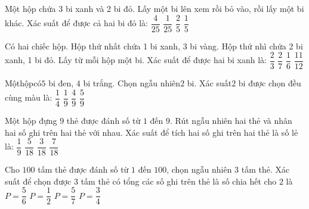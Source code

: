 \begin{ex}
Một hộp chứa 3 bi xanh và 2 bi đỏ. Lấy một bi lên xem rồi bỏ vào, rồi lấy một bi khác. Xác suất để được cả hai bi đỏ là:
\choice
{$\dfrac{4}{25}$}
{$\dfrac{1}{25}$}
{\True $\dfrac{2}{5}$}
{$\dfrac{1}{5}$}
\end{ex}
\begin{ex}
Có hai chiếc hộp. Hộp thứ nhất chứa 1 bi xanh, 3 bi vàng. Hộp thứ nhì chứa 2 bi xanh, 1 bi đỏ. Lấy từ mỗi hộp một bi. Xác suất để được hai bi xanh là:
\choice
{$\dfrac{2}{3}$}
{$\dfrac{2}{7}$}
{\True $\dfrac{1}{6}$}
{$\dfrac{11}{12}$}
\end{ex}
\begin{ex}
Mộthộpcó$5$ bi đen, $4$ bi trắng. Chọn ngẫu nhiên$2$ bi. Xác suất$2$ bi được chọn đều cùng màu là:
\choice
{$\dfrac{1}{4}$}
{$\dfrac{1}{9}$}
{\True $\dfrac{4}{9}$}
{$\dfrac{5}{9}$}
\end{ex}
\begin{ex}
Một hộp đựng $9$ thẻ được đánh số từ $1$ đến $9$. Rút ngẫu nhiên hai thẻ và nhân hai số ghi trên hai thẻ với nhau. Xác suất để tích hai số ghi trên hai thẻ là số lẻ là:
\choice
{$\dfrac{1}{9}$}
{\True $\dfrac{5}{18}$}
{$\dfrac{3}{18}$}
{$\dfrac{7}{18}$}
\end{ex}
\begin{ex}
Cho $100$ tấm thẻ được đánh số từ $1$ đến $100$, chọn ngẫu nhiên $3$ tấm thẻ. Xác suất để chọn được $3$ tấm thẻ có tổng các số ghi trên thẻ là số chia hết cho $2$ là
\choice
{$P=\dfrac{5}{6}$}
{\True $P=\dfrac{1}{2}$}
{$P=\dfrac{5}{7}$}
{$P=\dfrac{3}{4}$}
\end{ex}
